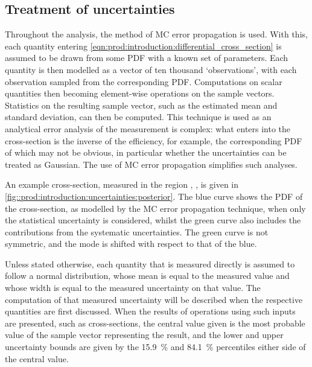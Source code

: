 \subsection{Treatment of uncertainties}
\label{chap:prod:introduction:uncertainties}

Throughout the analysis, the method of \acl{MC} error propagation is used.
With this, each quantity entering 
\cref{eqn:prod:introduction:differential_cross_section} is assumed to be drawn 
from some \acf{PDF} with a known set of parameters.
Each quantity is then modelled as a vector of ten thousand `observations', with 
each observation sampled from the corresponding \ac{PDF}.
Computations on scalar quantities then becoming element-wise operations on the 
sample vectors.
Statistics on the resulting sample vector, such as the estimated mean and 
standard deviation, can then be computed.
This technique is used as an analytical error analysis of the measurement is 
complex: what enters into the cross-section is the inverse of the efficiency, 
for example, the corresponding \acl{PDF} of which may not be obvious, in 
particular whether the uncertainties can be treated as Gaussian.
The use of \acl{MC} error propagation simplifies such analyses.

An example cross-section, measured in the region , 
, is given in 
\cref{fig::prod:introduction:uncertainties:posterior}.
The blue curve shows the \ac{PDF} of the cross-section, as modelled by the 
\ac{MC} error propagation technique, when only the statistical uncertainty is 
considered, whilst the green curve also includes the contributions from the 
systematic uncertainties.
The green curve is not symmetric, and the mode is shifted with respect to that 
of the blue.

Unless stated otherwise, each quantity that is measured directly is assumed to 
follow a normal distribution, whose mean is equal to the measured value and 
whose width is equal to the measured uncertainty on that value.
The computation of that measured uncertainty will be described when the 
respective quantities are first discussed.
When the results of operations using such inputs are presented, such as 
cross-sections, the central value given is the most probable value of the 
sample vector representing the result, and the lower and upper uncertainty 
bounds are given by the \SI{15.9}{\percent} and \SI{84.1}{\percent} percentiles 
either side of the central value.

